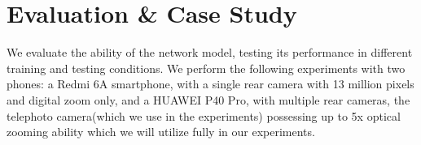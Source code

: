 \section{Evaluation \& Case Study}
\label{sec-evaluation}
We evaluate the ability of the network model, testing its performance in different training and testing conditions. We perform the following experiments with two phones: a Redmi 6A smartphone, with a single rear camera with 13 million pixels and digital zoom only, and a HUAWEI P40 Pro, with multiple rear cameras, the telephoto camera(which we use in the experiments) possessing up to 5x optical zooming ability which we will utilize fully in our experiments. 
